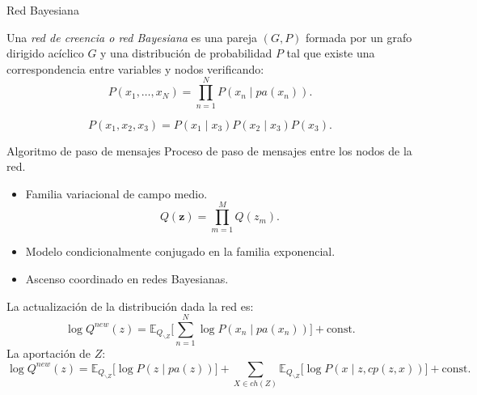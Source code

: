 \documentclass[aspectratio=169]{beamer}
\newcommand{\bz}{\bm{z}}
\newcommand\E[2]{\mathbb{E}_{#1}\Big[#2\Big]}
\begin{document}
  \begin{frame}{Red Bayesiana}
    \begin{shaded}
      Una \emph{red de creencia o red Bayesiana} es una pareja \((G,P)\) formada por un grafo dirigido acíclico \(G\) y una distribución de probabilidad \(P\) tal que existe una correspondencia entre variables y nodos verificando:
      \[
        P(x_{1},\dots,x_{N}) = \prod_{n=1}^{N}P(x_{n}\mid pa(x_{n})).
      \]
    \end{shaded}
    \centering
    \[
      P(x_{1}, x_{2}, x_{3}) = P(x_{1} \mid x_{3})P(x_{2}\mid x_{3})P(x_{3}).
    \]
  \end{frame}

  \begin{frame}{Algoritmo de paso de mensajes}
    Proceso de paso de mensajes entre los nodos de la red.
    \begin{itemize}
      \item Familia variacional de campo medio.
        \[Q(\bz) = \prod_{m=1}^{M}Q(z_{m}).\]
      \item Modelo condicionalmente conjugado en la familia exponencial.
      \item Ascenso coordinado en redes Bayesianas.
    \end{itemize}
  \end{frame}

  \begin{frame}
    La actualización de la distribución dada la red es:
    \[
      \log Q^{new}(z) = \E{Q_{\backslash Z}}{ \sum_{n=1}^N \log P(x_n \mid pa(x_n))} + \text{const.}
    \]
     La aportación de \(Z\):
    \[
        \log Q^{new}(z) = \E{Q_{\backslash Z}}{\log P(z \mid pa(z))} + \sum_{X \in ch(Z)} \E{Q_{\backslash Z}}{\log P(x \mid z,cp(z, x))} + \text{const.}
    \]
  \end{frame}
\end{document}
